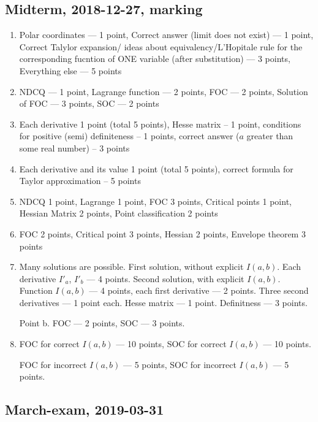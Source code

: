 \subsection{Midterm, 2018-12-27, marking}

\begin{enumerate}
\item Polar coordinates — 1 point, Correct answer (limit does not exist) — 1 point, Correct Talylor expansion/ ideas about equivalency/L'Hopitale rule for the corresponding fucntion of ONE variable (after substitution) — 3 points, Everything else — 5 points
\item
NDCQ — 1 point, Lagrange function — 2 points, FOC — 2 points, Solution of FOC — 3 points, SOC — 2 points

  \item Each derivative 1 point (total 5 points), Hesse matrix – 1
  point, conditions for positive (semi) definiteness – 1 points, correct answer ($a$ greater than some real number) – 3 points
 \item  Each derivative and its value 1 point (total 5 points), correct formula for Taylor approximation – 5
points
\item NDCQ 1 point, Lagrange 1 point, FOC 3 points, Critical points 1 point, Hessian Matrix 2 points, Point classification 2 points
\item FOC 2 points, Critical point 3 points, Hessian 2 points, Envelope theorem 3 points
  \item Many solutions are possible. First solution, without explicit $I(a,b)$. Each derivative $I'_a$, $I'_b$ — 4 points. Second solution, with explicit $I(a,b)$. Function $I(a,b)$ — 4 points, each first derivative — 2 points.
  Three second derivatives — 1 point each. Hesse matrix — 1 point. Definitness — 3 points.

  Point b. FOC — 2 points, SOC — 3 points.
  \item FOC for correct $I(a,b)$ — 10 points, SOC for correct $I(a,b)$ — 10 points.

FOC for incorrect $I(a,b)$ — 5 points, SOC for incorrect $I(a,b)$ — 5 points.

\end{enumerate}
\subsection{March-exam, 2019-03-31}


